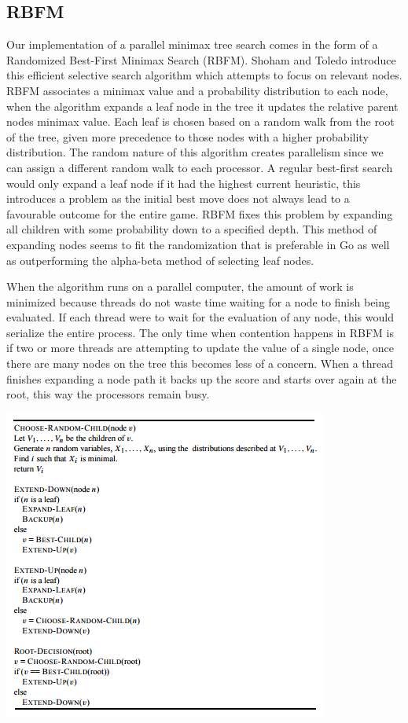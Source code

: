 \documentclass[conference]{IEEEtran}
\begin{document}
\subsection{RBFM}
Our implementation of a parallel minimax tree search comes in the form of a Randomized Best-First Minimax Search (RBFM). Shoham and Toledo introduce this efficient selective search algorithm which attempts to focus on relevant nodes. RBFM associates a minimax value and a probability distribution to each node, when the algorithm expands a leaf node in the tree it updates the relative parent nodes minimax value. Each leaf is chosen based on a random walk from the root of the tree, given more precedence to those nodes with a higher probability distribution. The random nature of this algorithm creates parallelism since we can assign a different random walk to each processor. A regular best-first search would only expand a leaf node if it had the highest current heuristic, this introduces a problem as the initial best move does not always lead to a favourable outcome for the entire game. RBFM fixes this problem by expanding all children with some probability down to a specified depth.  This method of expanding nodes seems to fit the randomization that is preferable in Go as well as outperforming the alpha-beta method of selecting leaf nodes.\par
When the algorithm runs on a parallel computer, the amount of work is minimized because threads do not waste time waiting for a node to finish being evaluated. If each thread were to wait for the evaluation of any node, this would serialize the entire process. The only time when contention happens in RBFM is if two or more threads are attempting to update the value of a single node, once there are many nodes on the tree this becomes less of a concern. When a thread finishes expanding a node path it backs up the score and starts over again at the root, this way the processors remain busy.\par
\includegraphics{RBFM}
\end{document}
